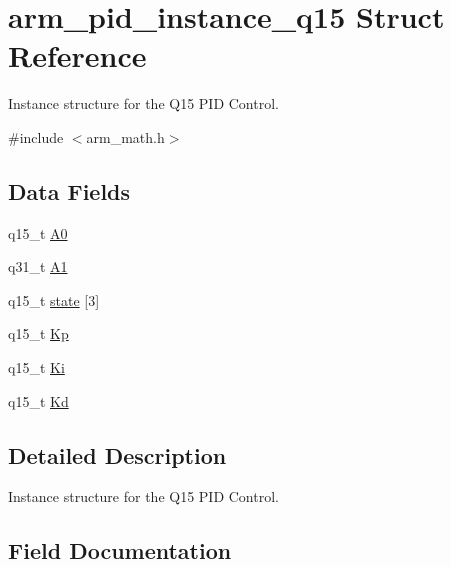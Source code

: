 \hypertarget{structarm__pid__instance__q15}{}\section{arm\+\_\+pid\+\_\+instance\+\_\+q15 Struct Reference}
\label{structarm__pid__instance__q15}


Instance structure for the Q15 P\+ID Control.  




{\ttfamily \#include $<$arm\+\_\+math.\+h$>$}

\subsection*{Data Fields}
\begin{DoxyCompactItemize}
\item 
q15\+\_\+t \mbox{\hyperlink{structarm__pid__instance__q15_a1aa73268c65cea0c7bc66bb70ff35205}{A0}}
\item 
q31\+\_\+t \mbox{\hyperlink{structarm__pid__instance__q15_aeb897c84724b56948e4222aca8d0e1f4}{A1}}
\item 
q15\+\_\+t \mbox{\hyperlink{structarm__pid__instance__q15_a4c4e19d77015f5f7a31a1daf0faf31b6}{state}} \mbox{[}3\mbox{]}
\item 
q15\+\_\+t \mbox{\hyperlink{structarm__pid__instance__q15_afef61fb3b64c73f2cd0c91d9dcf95679}{Kp}}
\item 
q15\+\_\+t \mbox{\hyperlink{structarm__pid__instance__q15_a19d5059baf06dd52266260d096702d0a}{Ki}}
\item 
q15\+\_\+t \mbox{\hyperlink{structarm__pid__instance__q15_abf38d18de1e16bc6d86846fedf8534fe}{Kd}}
\end{DoxyCompactItemize}


\subsection{Detailed Description}
Instance structure for the Q15 P\+ID Control. 

\subsection{Field Documentation}
\mbox{\label{structarm__pid__instance__q15_a1aa73268c65cea0c7bc66bb70ff35205}} 
